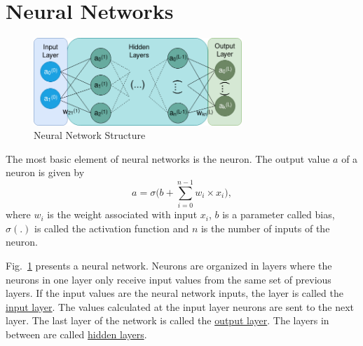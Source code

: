 
\section{Neural Networks}
\label{section:neural_networks}

\begin{figure}[!htb]
	\centering
	\includegraphics[width=0.70\textwidth]{Figures/FCNN.png}
	\caption[Caption for figure in TOC.]{Neural Network Structure}
	\label{fig:FCNN}
\end{figure}

The most basic element of neural networks is the neuron. The output value $a$ of
a neuron is given by
\begin{equation}
a  = \sigma\Big( b + \sum_{i=0}^{n-1} w_{i}\times x_i \Big),
\label{eq:neuron_value}
\end{equation}
where $w_i$ is the weight associated with input $x_i$, $b$ is a parameter called
bias, $\sigma(.)$ is called the activation function and $n$ is the number of
inputs of the neuron.

Fig.~\ref{fig:FCNN} presents a neural network. Neurons are organized in layers
where the neurons in one layer only receive input values from the same set of
previous layers. If the input values are the neural network inputs, the layer is
called the \underline{input layer}. The values calculated at the input layer
neurons are sent to the next layer. The last layer of the network is called the
\underline{output layer}. The layers in between are called \underline{hidden
  layers}.

